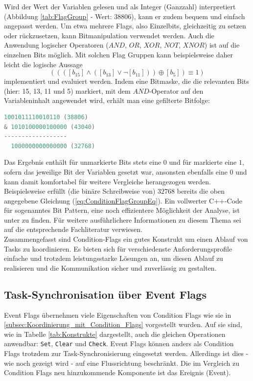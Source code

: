 \documentclass{llncs}
\begin{document}
Wird der Wert der Variablen gelesen und als Integer (Ganzzahl) interpretiert (Abbildung \ref{tab:FlagGroup} - Wert: $38806$), kann er zudem bequem und einfach angepasst werden. Um etwa mehrere Flags, also Einzelbits, gleichzeitig zu setzen oder rückzusetzen, kann Bitmanipulation verwendet werden. Auch die Anwendung logischer Operatoren ($AND$, $OR$, $XOR$, $NOT$, $XNOR$) ist auf die einzelnen Bits möglich. Mit solchen Flag Gruppen kann beispielsweise daher leicht die logische Aussage %
\begin{equation}
((([b_{15}] \wedge ([b_{13}] \vee \neg[b_{11}]))\oplus [b_{5}])\equiv 1)
\label{eq:ConditionFlagGroupEq}
\end{equation}
implementiert und evaluiert werden. Indem eine Bitmaske, die die relevanten Bits (hier: 15, 13, 11 und 5) markiert, mit dem $AND$-Operator auf den Variableninhalt angewendet wird, erhält man eine gefilterte Bitfolge:
{
\lstset{basicstyle=\footnotesize, frame=tb, xleftmargin=.36\textwidth, xrightmargin=.3\textwidth}
\begin{lstlisting}[language=C]
  1001011110010110 (38806)
& 1010100000100000 (43040)
------------------
  1000000000000000 (32768)
\end{lstlisting}
}
Das Ergebnis enthält für unmarkierte Bits stets eine $0$ und für markierte eine $1$, sofern das jeweilige Bit der Variablen gesetzt war, ansonsten ebenfalls eine $0$ und kann damit komfortabel für weitere Vergleiche herangezogen werden. Beispielsweise erfüllt (die binäre Schreibweise von) $32768$ bereits die oben angegebene Gleichung (\ref{eq:ConditionFlagGroupEq}). Ein vollwerter C++-Code für sogenanntes Bit Pattern, eine noch effizientere Möglichkeit der Analyse, ist unter \autocite{Turner2020} zu finden. Für weitere ausführlichere Informationen zu diesem Thema sei auf die entsprechende Fachliteratur verwiesen.\\

Zusammengefasst sind Condition-Flags ein gutes Konstrukt um einen Ablauf von Tasks zu koordinieren. Es bieten sich für verschiedenste Anforderungsprofile einfache und trotzdem leistungsstarke Lösungen an, um diesen Ablauf zu realisieren und die Kommunikation sicher und zuverlässig zu gestalten.

\subsection{Task-Synchronisation über Event Flags}
\label{subsec:Task-Synchronisation_Event_Flags}
Event Flags übernehmen viele Eigenschaften von Condition Flags wie sie in \ref{subsec:Koordinierung_mit_Condition_Flags} vorgestellt wurden. Auf sie sind, wie in Tabelle \ref{tab:Konstrukte} dargestellt, auch die gleichen Operationen anwendbar: \texttt{Set}, \texttt{Clear} und \texttt{Check}. Event Flags können anders als Condition Flags trotzdem zur Task-Synchronisierung eingesetzt werden. Allerdings ist dies - wie noch gezeigt wird - auf eine Flussrichtung beschränkt. Die im Vergleich zu Condition Flags neu hinzukommende Komponente ist das Ereignis (Event).\\
\end{document}
